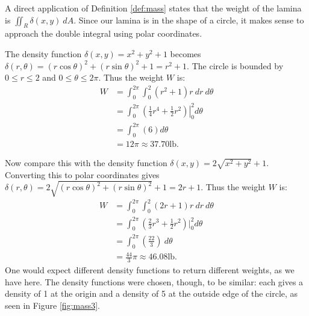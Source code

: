 {A direct application of Definition \ref{def:mass} states that the weight of the lamina is $\iint_R\delta(x,y)\ dA$. Since our lamina is in the shape of a circle, it makes sense to approach the double integral using polar coordinates.

The density function $\delta(x,y) = x^2+y^2+1$ becomes $\delta(r,\theta) = (r\cos\theta)^2+(r\sin\theta)^2+1 = r^2+1$. The circle is bounded by $0\leq r\leq 2$ and $0\leq\theta\leq2\pi$. Thus the weight $W$ is:
\begin{align*}
W &= \int_0^{2\pi}\int_0^2 (r^2+1)r\ dr\ d\theta\\
	&= \int_0^{2\pi} \left.\left(\frac14r^4+\frac12r^2\right)\right|_0^2d\theta\\
	&= \int_0^{2\pi} \left(6\right) d\theta\\
	&= 12\pi \approx 37.70\text{lb}.
\end{align*}

Now compare this with the density function $\delta(x,y) = 2\sqrt{x^2+y^2}+1$. Converting this to polar coordinates gives $\delta(r,\theta) = 2\sqrt{(r\cos\theta)^2+(r\sin\theta)^2}+1 = 2r+1$. Thus the weight $W$ is:
\begin{align*}
W &= \int_0^{2\pi}\int_0^2 (2r+1)r\ dr\ d\theta\\
	&= \int_0^{2\pi} (\frac23r^3+\frac12r^2)\Big|_0^2d\theta\\
	&= \int_0^{2\pi} \left(\frac{22}3\right)\ d\theta\\
	&= \frac{44}3\pi \approx 46.08\text{lb}.
\end{align*}
One would expect different density functions to return different weights, as we have here. The density functions were chosen, though, to be similar: each gives a density of 1 at the origin and a density of 5 at the outside edge of the circle, as seen in Figure \ref{fig:mass3}.\\

}
